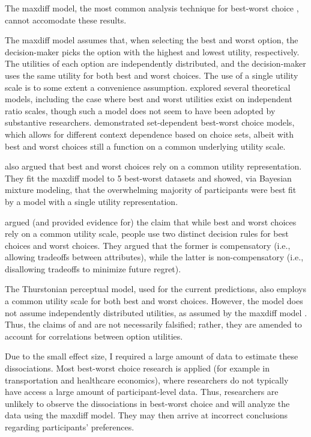The maxdiff model, the most common analysis technique for best-worst choice \parencite{marleyProbabilisticModelsBest2005,hawkinsIntegratingCognitiveProcess2014a,muhlbacher2016experimental,de2017relations}, cannot accomodate these results.  

The maxdiff model assumes that, when selecting the best and worst option, the decision-maker picks the option with the highest and lowest utility, respectively. The utilities of each option are independently distributed, and the decision-maker uses the same utility for both best and worst choices. The use of a single utility scale is to some extent a convenience assumption. \textcite{marleyProbabilisticModelsBest2005} explored several theoretical models, including the case where best and worst utilities exist on independent ratio scales, though such a model does not seem to have been adopted by substantive researchers. \textcite{marleyProbabilisticModelsSetdependent2008} demonstrated set-dependent best-worst choice models, which allows for different context dependence based on choice sets, albeit with best and worst choices still a function on a common underlying utility scale. 

\textcite{hawkins2019like} also argued that best and worst choices rely on a common utility representation. They fit the maxdiff model to 5 best-worst datasets and showed, via Bayesian mixture modeling, that the overwhelming majority of participants were best fit by a model with a single utility representation. 

\textcite{gervzinivc2021estimating} argued (and provided evidence for) the claim that while best and worst choices rely on a common utility scale, people use two distinct decision rules for best choices and worst choices. They argued that the former is compensatory (i.e., allowing tradeoffs between attributes), while the latter is non-compensatory (i.e., disallowing tradeoffs to minimize future regret). 

The Thurstonian perceptual model, used for the current predictions, also employs a common utility scale for both best and worst choices. However, the model does not assume independently distributed utilities, as assumed by the maxdiff model \parencite{de2017relations}. Thus, the claims of \textcite{hawkinsBestTimesWorst2014} and \textcite{hawkins2019like} are not necessarily falsified; rather, they are amended to account for correlations between option utilities.

Due to the small effect size, I required a large amount of data to estimate these dissociations. Most best-worst choice research is applied (for example in transportation and healthcare economics), where researchers do not typically have access a large amount of participant-level data. Thus, researchers are unlikely to observe the dissociations in best-worst choice and will analyze the data using the maxdiff model. They may then arrive at incorrect conclusions regarding participants' preferences. 

